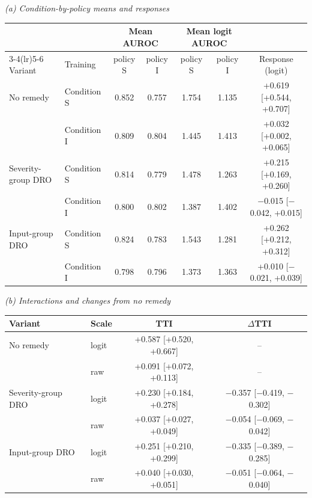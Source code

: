 \textit{(a) Condition-by-policy means and responses}\\[2pt]
\begin{tabular}{@{}llccccc@{}}
\toprule
 & & \multicolumn{2}{c}{Mean AUROC} & \multicolumn{2}{c}{Mean logit AUROC} & \\
\cmidrule(lr){3-4}\cmidrule(lr){5-6}
Variant & Training & policy S & policy I & policy S & policy I & Response \R{} (logit) \\
\midrule
No remedy & Condition S & 0.852 & 0.757 & 1.754 & 1.135 & +0.619 [+0.544, +0.707] \\
 & Condition I & 0.809 & 0.804 & 1.445 & 1.413 & +0.032 [+0.002, +0.065] \\
\addlinespace
Severity-group DRO & Condition S & 0.814 & 0.779 & 1.478 & 1.263 & +0.215 [+0.169, +0.260] \\
 & Condition I & 0.800 & 0.802 & 1.387 & 1.402 & $-$0.015 [$-$0.042, +0.015] \\
\addlinespace
Input-group DRO & Condition S & 0.824 & 0.783 & 1.543 & 1.281 & +0.262 [+0.212, +0.312] \\
 & Condition I & 0.798 & 0.796 & 1.373 & 1.363 & +0.010 [$-$0.021, +0.039] \\
\bottomrule
\end{tabular}

\medskip
\textit{(b) Interactions and changes from no remedy}\\[2pt]
\begin{tabular}{@{}llcc@{}}
\toprule
Variant & Scale & TTI & $\Delta$TTI \\
\midrule
No remedy & logit & +0.587 [+0.520, +0.667] & -- \\
 & raw & +0.091 [+0.072, +0.113] & -- \\
\addlinespace
Severity-group DRO & logit & +0.230 [+0.184, +0.278] & $-$0.357 [$-$0.419, $-$0.302] \\
 & raw & +0.037 [+0.027, +0.049] & $-$0.054 [$-$0.069, $-$0.042] \\
\addlinespace
Input-group DRO & logit & +0.251 [+0.210, +0.299] & $-$0.335 [$-$0.389, $-$0.285] \\
 & raw & +0.040 [+0.030, +0.051] & $-$0.051 [$-$0.064, $-$0.040] \\
\bottomrule
\end{tabular}


